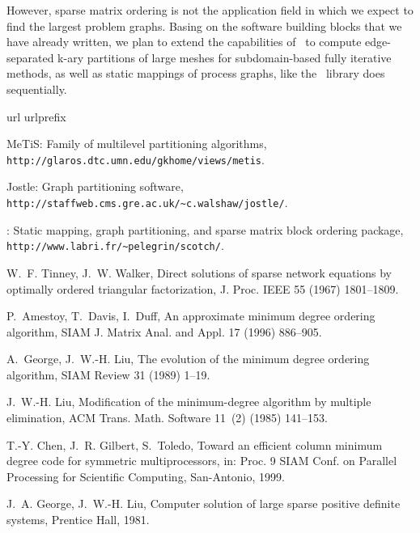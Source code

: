 \documentclass[fleqn,12pt,twoside]{article}
\newcommand{\lbt}{\linebreak[2]}
\newcommand{\jostle}{{\sc Jostle}}               \newcommand{\metis}{\mbox{\sc MeTiS}}    \newcommand{\ometis}{\mbox{\sc O-MeTiS}} \newcommand{\parmetis}{\mbox{\sc ParMeTiS}}
\begin{document}
However, sparse matrix ordering is not the application field in which
we expect to find the largest problem graphs. Basing on the software
building blocks that we have already written, we plan to extend the
capabilities of \ptscotch\ to compute edge-separated k-ary partitions
of large meshes for subdomain-based fully iterative methods, as well
as static mappings of process graphs, like the \scotch\ library does
sequentially.





\begin{thebibliography}{10}
\expandafter\ifx\csname url\endcsname\relax
  \def\url#1{\texttt{#1}}\fi
\expandafter\ifx\csname urlprefix\endcsname\relax\def\urlprefix{URL }\fi

{\metis}: {F}amily of multilevel partitioning algorithms, {\tt http://\lbt
  glaros.\lbt dtc.\lbt umn.\lbt edu/\lbt gkhome/\lbt views/\lbt metis}.

{\jostle}: Graph partitioning software, {\tt http://\lbt staffweb.\lbo cms.\lbt
  gre.\lbt ac.\lbo uk/\lbt \~{}c.\lbo walshaw/\lbt jostle/}.

{\scotch}: Static mapping, graph partitioning, and sparse matrix block ordering
  package, {\tt http://\lbt www.\lbo labri.\lbo fr/\lbt \~{}pelegrin/\lbt
  scotch/}.

W.~F. Tinney, J.~W. Walker, Direct solutions of sparse network equations by
  optimally ordered triangular factorization, {J}. {P}roc. {IEEE} 55 (1967)
  1801--1809.

P.~Amestoy, T.~Davis, I.~Duff, An approximate minimum degree ordering
  algorithm, {SIAM} {J}. {M}atrix {A}nal. and {A}ppl. 17 (1996) 886--905.

A.~George, J.~W.-H. Liu, The evolution of the minimum degree ordering
  algorithm, {SIAM} {R}eview 31 (1989) 1--19.

J.~W.-H. Liu, Modification of the minimum-degree algorithm by multiple
  elimination, {ACM} {T}rans. {M}ath. {S}oftware 11~(2) (1985) 141--153.

T.-Y. Chen, J.~R. Gilbert, S.~Toledo, Toward an efficient column minimum degree
  code for symmetric multiprocessors, in: Proc. 9 {SIAM} {C}onf. on
  {P}arallel {P}rocessing for {S}cientific {C}omputing, San-Antonio, 1999.

J.~A. George, J.~W.-H. Liu, Computer solution of large sparse positive definite
  systems, Prentice Hall, 1981.


\end{thebibliography}
\end{document}
